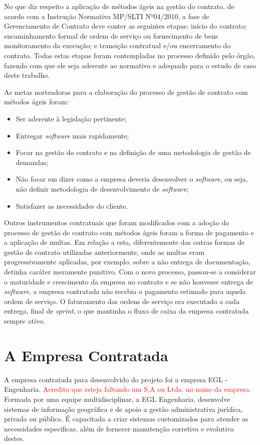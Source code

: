 No que diz respeito a aplicação de métodos ágeis na gestão do contrato, de acordo com a Instrução Normativa MP/SLTI Nº04/2010, a fase de Gerenciamento de Contrato deve conter as seguintes etapas: início do contrato; encaminhamento formal de ordem de serviço ou fornecimento de bens  monitoramento da execução; e transição contratual e/ou encerramento do contrato. Todas estas etapas foram contempladas no processo definido pelo órgão, fazendo com que ele seja aderente ao normativo e adequado para o estudo de caso deste trabalho.

As metas norteadoras para a elaboração do processo de gestão de contrato com métodos ágeis foram:
\begin{itemize}
\item Ser aderente à legislação pertinente;
\item Entregar \textit{software} mais rapidamente;
\item Focar na gestão do contrato e na definição de uma metodologia de gestão de demandas;
\item Não focar em dizer como a empresa deveria desenvolver o \textit{software}, ou seja, não definir metodologia de desenvolvimento de \textit{software};
\item Satisfazer as necessidades do cliente.
\end{itemize}

Outros instrumentos contratuais que foram modificados com a adoção do processo de gestão de contrato com métodos ágeis foram a forma de pagamento e a aplicação de multas. Em relação a esta, diferentemente das outras formas de gestão de contrato utilizadas anteriormente, onde as multas eram progressivamente aplicadas, por exemplo, sobre a não entrega de documentação, detinha caráter meramente punitivo. Com o novo processo, passou-se a considerar o maturidade e crescimento da empresa no contrato e  se não houvesse entrega de \textit{software}, a empresa contratada não recebia o pagamento estimado para aquela ordem de serviço. O faturamento das ordens de serviço era executado a cada entrega, final de \textit{sprint}, o que mantinha o fluxo de caixa da empresa contratada sempre ativo.


\section[A Empresa Contratada]{A Empresa Contratada}

A empresa contratada para desenvolvido do projeto foi a empresa EGL - Engenharia. \textcolor{red}{Acredito que esteja  faltando um S.A ou Ltda. no nome da empresa.} Formada por uma equipe multidisciplinar, a EGL Engenharia, desenvolve sistemas de informação geográfica e de apoio a gestão administrativa jurídica, privada ou pública. É capacitada a criar sistemas customizados para atender as necessidades especificas, além de fornecer manutenção corretiva e evolutiva destes.

